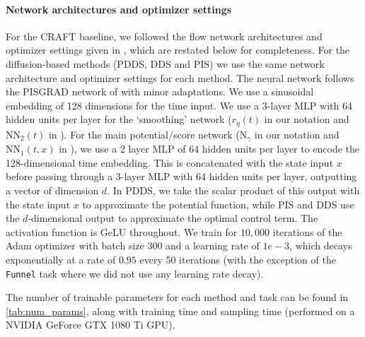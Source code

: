 \documentclass{article}
\theoremstyle{plain}
\theoremstyle{definition}
\theoremstyle{remark}
\begin{document}
\paragraph{Network architectures and optimizer settings} For the CRAFT baseline, we followed the flow network architectures and optimizer settings given in \citet{Matthews2022}, which are restated below for completeness. For the diffusion-based methods (PDDS, DDS and PIS) we use the same network architecture and optimizer settings for each method. The neural network follows the PISGRAD network of \citet{zhangyongxinchen2021path} with minor adaptations. We use a sinusoidal embedding of 128 dimensions for the time input. We use a 3-layer MLP with 64 hidden units per layer for the `smoothing' network ($r_\eta(t)$ in our notation and $\mathrm{NN}_2(t)$ in \citet{zhangyongxinchen2021path}). For the main potential/score network ($\mathrm{N}_\gamma$ in our notation and $\mathrm{NN}_1(t, x)$ in \citet{zhangyongxinchen2021path}), we use a 2 layer MLP of 64 hidden units per layer to encode the 128-dimensional time embedding. This is concatenated with the state input $x$ before passing through a 3-layer MLP with 64 hidden units per layer, outputting a vector of dimension $d$. In PDDS, we take the scalar product of this output with the state input $x$ to approximate the potential function, while PIS and DDS use the $d$-dimensional output to approximate the optimal control term. The activation function is GeLU throughout. We train for $10,000$ iterations of the Adam optimizer \cite{adam} with batch size $300$ and a learning rate of $1e-3$, which decays exponentially at a rate of $0.95$ every 50 iterations (with the exception of the \verb|Funnel| task where we did not use any learning rate decay).

The number of trainable parameters for each method and task can be found in \cref{tab:num_params}, along with training time and sampling time (performed on a NVIDIA GeForce GTX 1080 Ti GPU).
\end{document}
